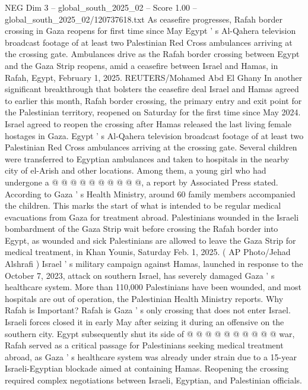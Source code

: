 \begin{textsample}{NEG Dim 3 – global\_south\_2025\_02 – Score 1.00 – global\_south\_2025\_02/120737618.txt}  \label{ex:f3_neg_042}
As ceasefire progresses, Rafah border crossing in Gaza reopens for first time since May Egypt ' s Al-Qahera television broadcast footage of at least two Palestinian Red Cross ambulances arriving at the crossing gate.
Ambulances drive as the Rafah border crossing between Egypt and the Gaza Strip reopens, amid a ceasefire between Israel and Hamas, in Rafah, Egypt, February 1, 2025.
REUTERS/Mohamed Abd El Ghany In another significant breakthrough that bolsters the ceasefire deal Israel and Hamas agreed to earlier this month, Rafah border crossing, the primary entry and exit point for the Palestinian territory, reopened on Saturday for the first time since May 2024.
Israel agreed to reopen the crossing after Hamas released the last living female hostages in Gaza.
Egypt ' s Al-Qahera television broadcast footage of at least two Palestinian Red Cross ambulances arriving at the crossing gate.
Several children were transferred to Egyptian ambulances and taken to hospitals in the nearby city of el-Arish and other locations.
Among them, a young girl who had undergone a @ @ @ @ @ @ @ @ @ @, a report by Associated Press stated.
According to Gaza ' s Health Ministry, around 60 family members accompanied the children.
This marks the start of what is intended to be regular medical evacuations from Gaza for treatment abroad.
Palestinians wounded in the Israeli bombardment of the Gaza Strip wait before crossing the Rafah border into Egypt, as wounded and sick Palestinians are allowed to leave the Gaza Strip for medical treatment, in Khan Younis, Saturday Feb. 1, 2025. ( AP Photo/Jehad Alshrafi ) Israel ' s military campaign against Hamas, launched in response to the October 7, 2023, attack on southern Israel, has severely damaged Gaza ' s healthcare system.
More than 110,000 Palestinians have been wounded, and most hospitals are out of operation, the Palestinian Health Ministry reports.
Why Rafah is Important?
Rafah is Gaza ' s only crossing that does not enter Israel.
Israeli forces closed it in early May after seizing it during an offensive on the southern city.
Egypt subsequently shut its side of @ @ @ @ @ @ @ @ @ @ war, Rafah served as a critical passage for Palestinians seeking medical treatment abroad, as Gaza ' s healthcare system was already under strain due to a 15-year Israeli-Egyptian blockade aimed at containing Hamas.
Reopening the crossing required complex negotiations between Israeli, Egyptian, and Palestinian officials.

\end{textsample}
